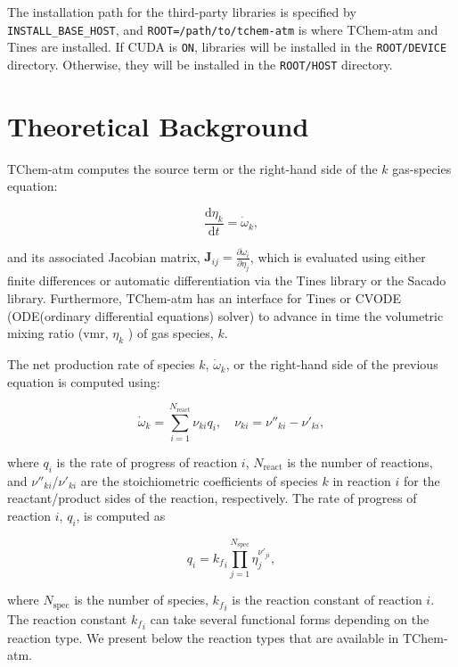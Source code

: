 \documentclass[report, 12pt]{SANDreport}
\newcommand{\dif}{\mathrm{d}}
\begin{document}
The installation path for the third-party libraries is specified by \verb|INSTALL_BASE_HOST|, and \Verb|ROOT=/path/to/tchem-atm| is where TChem-atm and Tines are installed. If CUDA is \verb|ON|, libraries will be installed in the \verb|ROOT/DEVICE| directory. Otherwise, they will be installed in the \verb|ROOT/HOST| directory.

\chapter{Theoretical Background}
\label{ch:theo}
TChem-atm computes the source term or the right-hand side of the $k$ gas-species equation:

\begin{equation}\label{eq:ode_vmr}
  \frac{\dif{} \eta_k}{\dif{} t}=\dot{\omega}_k,
\end{equation}

and its associated Jacobian matrix, $\textbf{J}_{ij} = \frac{\partial \dot{\omega}_i}{\partial \eta_j }$, which is evaluated using either finite differences or automatic differentiation via the Tines library or the Sacado library. Furthermore, TChem-atm has an interface for Tines or CVODE (ODE(ordinary differential equations) solver) to advance in time the volumetric mixing ratio (vmr, $\eta_k$ ) of gas species, $k$.

The net production rate of species $k$, $\dot{\omega}_k$, or the right-hand side of the previous equation is computed using:

\begin{equation}\label{eq:net_production_rates}
  \dot{\omega}_k=\sum_{i=1}^{N_{\text{react}}}\nu_{ki}q_i,\quad \nu_{ki}=\nu''_{ki}-\nu'_{ki},
\end{equation}

where $q_i$ is the rate of progress of reaction $i$, $N_{\text{react}}$ is the number of reactions, and $\nu''_{ki}$/$\nu'_{ki}$ are the stoichiometric coefficients of species $k$ in reaction $i$ for the reactant/product sides of the reaction, respectively. The rate of progress of reaction $i$, $q_i$, is computed as

\begin{equation}\label{eq:rate_of_progress}
  q_i={k_f}_i\prod_{j=1}^{N_{\text{spec}}}\eta_j^{\nu'_{ji}},
\end{equation}

where $N_{\text{spec}}$ is the number of species, ${k_f}_i$ is the reaction constant of reaction $i$. The reaction constant ${k_f}_i$ can take several functional forms depending on the reaction type. We present below the reaction types that are available in TChem-atm.
\end{document}
